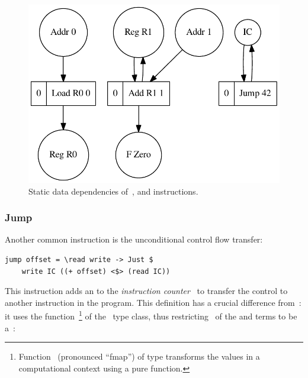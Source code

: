 
\vspace{-2em}
\begin{figure}
\includegraphics[width=35em]{img/loadJumpAdd.pdf}
\caption{Static data dependencies of~,  and
 instructions\protect\footnotemark.}
\end{figure}
\vspace{-2em}

\subsubsection{Jump}

Another common instruction is the unconditional control flow transfer:

\begin{verbatim}
jump offset = \read write -> Just $
    write IC ((+ offset) <$> (read IC))
\end{verbatim}

\noindent
This instruction adds an  to the \emph{instruction counter}~
to transfer the control to another instruction in the program. This definition
has a crucial difference from~: it uses the
function~\hs{<$>}\footnote{Function~\hs{<$>} (pronounced ``fmap'') of type
 transforms the values in a
computational context  using a pure function.} of the~ type
class, thus restricting~ of the  and  terms to be
a~:


